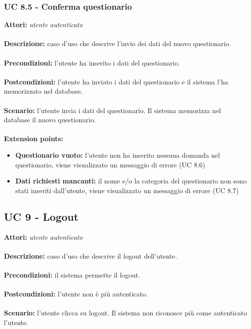 \documentclass[a4paper,11pt]{article}
\begin{document}
\subsubsection{UC 8.5 - Conferma questionario}

\textbf{Attori:} \textit{utente autenticato}
\\ \\
\textbf{Descrizione:} caso d'uso che descrive l'invio dei dati del nuovo questionario.\\
\\
\textbf{Precondizioni:} l'utente ha inserito i dati del questionario.\\
\\
\textbf{Postcondizioni:} l’utente ha inviato i dati del questionario e il sistema l'ha memorizzato nel database.\\
\\
\textbf{Scenario:} l’utente invia i dati del questionario. Il sistema memorizza nel database il nuovo questionario.\\
\\
\textbf{Extension points:} 
\begin{itemize}
	\item \textbf{Questionario vuoto:} l'utente non ha inserito nessuna domanda nel questionario, viene visualizzato un messaggio di errore (UC 8.6)
	\item \textbf{Dati richiesti mancanti:} il nome e/o la categoria del questionario non sono stati inseriti dall'utente, viene visualizzato un messaggio di errore (UC 8.7)
\end{itemize}


\subsection{UC 9 - Logout}

\textbf{Attori:} \textit{utente autenticato}
\\ \\
\textbf{Descrizione:} caso d'uso che descrive il logout dell'utente.\\
\\
\textbf{Precondizioni:} il sistema permette il logout.\\
\\
\textbf{Postcondizioni:} l’utente non è più autenticato.\\
\\
\textbf{Scenario:} l’utente clicca su logout. Il sistema non riconosce più come autenticato l'utente.\\
	
\end{document}
